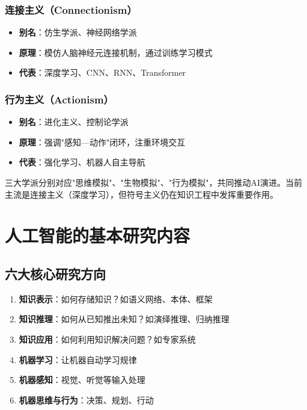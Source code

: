 \subsubsection{连接主义（Connectionism）}
\begin{itemize}[leftmargin=2em,itemsep=0pt]
    \item \textbf{别名}：仿生学派、神经网络学派
    \item \textbf{原理}：模仿人脑神经元连接机制，通过训练学习模式
    \item \textbf{代表}：深度学习、CNN、RNN、Transformer
\end{itemize}

\subsubsection{行为主义（Actionism）}
\begin{itemize}[leftmargin=2em,itemsep=0pt]
    \item \textbf{别名}：进化主义、控制论学派
    \item \textbf{原理}：强调"感知—动作"闭环，注重环境交互
    \item \textbf{代表}：强化学习、机器人自主导航
\end{itemize}

\begin{tipbox}
三大学派分别对应"思维模拟"、"生物模拟"、"行为模拟"，共同推动AI演进。当前主流是连接主义（深度学习），但符号主义仍在知识工程中发挥重要作用。
\end{tipbox}

\section{人工智能的基本研究内容}

\subsection{六大核心研究方向}
\begin{enumerate}[leftmargin=2em,itemsep=0pt]
    \item \textbf{知识表示}：如何存储知识？如语义网络、本体、框架
    \item \textbf{知识推理}：如何从已知推出未知？如演绎推理、归纳推理
    \item \textbf{知识应用}：如何利用知识解决问题？如专家系统
    \item \textbf{机器学习}：让机器自动学习规律
    \item \textbf{机器感知}：视觉、听觉等输入处理
    \item \textbf{机器思维与行为}：决策、规划、行动
\end{enumerate}

